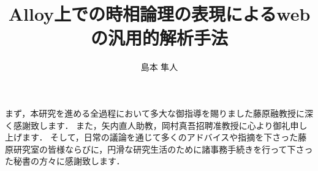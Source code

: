 \documentclass[12pt,a4paper]{jbook}
\title{Alloy上での時相論理の表現によるwebの汎用的解析手法}
\author{島本 隼人}
\begin{document}
\coverpage
\tableofcontents
\listoffigures
\listoftables
\body








\acknowledgement
まず，本研究を進める全過程において多大な御指導を賜りました藤原融教授に深く感謝致します．
また，矢内直人助教，岡村真吾招聘准教授に心より御礼申し上げます．
そして，日常の議論を通じて多くのアドバイスや指摘を下さった藤原研究室の皆様ならびに，円滑な研究生活のために諸事務手続きを行って下さった秘書の方々に感謝致します．


 
\end{document}

